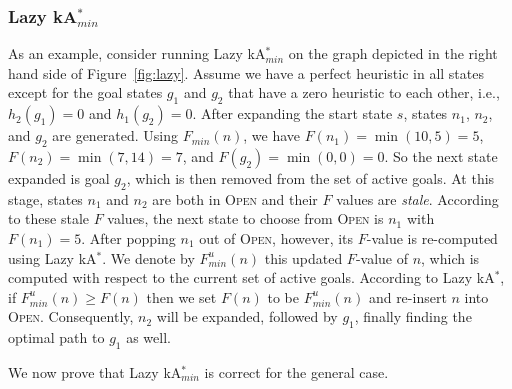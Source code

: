 \documentclass{aicom2e}
\newcommand{\kastar}{kA$^*$}
\newcommand{\kastarmin}{kA$^*_{min}$}
\newcommand{\minf}{$F_{min}(n)$}
\newcommand{\open}{\textsc{Open}}
\begin{document}
\subsubsection{Lazy \kastarmin{}}

As an example, consider running Lazy \kastarmin{} on the graph depicted in the
right hand side of Figure~\ref{fig:lazy}. Assume we have a perfect heuristic in
all states except for the goal states $g_1$ and $g_2$ that have a zero
heuristic to each other, i.e., $h_2(g_1)=0$ and $h_1(g_2)=0$. After expanding
the start state $s$, states $n_1$, $n_2$, and $g_2$ are generated. Using
\minf{}, we have $F(n_1)=\min(10,5)=5$, $F(n_2)=\min(7,14)=7$, and
$F(g_2)=\min(0,0)=0$. So the next state expanded is goal $g_2$, which is then
removed from the set of active goals. At this stage, states $n_1$ and $n_2$ are
both in \open{} and their $F$ values are {\em stale}. 
According to these stale $F$ values, the next state to
choose from \open{} is $n_1$ with $F(n_1)=5$. After popping $n_1$ out of
\open{}, however, its $F$-value is re-computed using Lazy \kastar{}. We denote
by $F^u_{min}(n)$ this updated $F$-value of $n$, which is computed with respect
to the current set of active goals. According to Lazy \kastar{}, if
$F^u_{min}(n)\geq F(n)$ then we set $F(n)$ to be $F^u_{min}(n)$ and re-insert
$n$ into \open{}. Consequently, $n_2$ will be expanded, followed by $g_1$,
finally finding the optimal path to $g_1$ as well.

We now prove that Lazy \kastarmin{} is correct for the general case.
\end{document}

